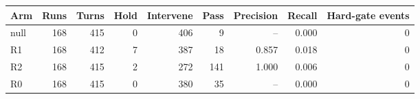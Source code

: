 \begin{tabular}{lrrrrrrrr}
\toprule
Arm & Runs & Turns & Hold & Intervene & Pass & Precision & Recall & Hard-gate events \\
\midrule
null & 168 & 415 & 0 & 406 & 9 & -- & 0.000 & 0 \\
R1 & 168 & 412 & 7 & 387 & 18 & 0.857 & 0.018 & 0 \\
R2 & 168 & 415 & 2 & 272 & 141 & 1.000 & 0.006 & 0 \\
R0 & 168 & 415 & 0 & 380 & 35 & -- & 0.000 & 0 \\
\bottomrule
\end{tabular}
